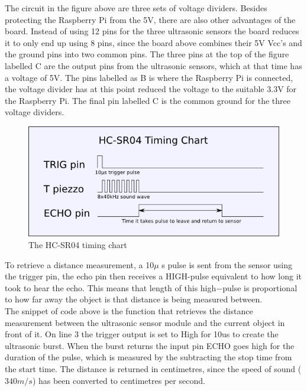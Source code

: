 The circuit in the figure above are three sets of voltage dividers. Besides protecting the Raspberry Pi from the 5V, there are also other advantages of the board. Instead of using 12 pins for the three ultrasonic sensors the board reduces it to only end up using 8 pins, since the board above combines their 5V Vcc's and the ground pins into two common pins.  
The three pins at the top of the figure labelled C are the output pins from the ultrasonic sensors, which at that time has a voltage of 5V. The pins labelled as B is where the Raspberry Pi is connected, the voltage divider has at this point reduced the voltage to the suitable 3.3V for the Raspberry Pi.  
The final pin labelled C is the common ground for the three voltage dividers.

\begin{figure}[H]
	\centering
	\includegraphics[width=.5\linewidth]{images/hcsr04timingchart.png}
	\caption{The HC-SR04 timing chart\cite{hcsr04timingchart}}
\end{figure}

To retrieve a distance measurement, a 10$\mu$ s pulse is sent from the sensor using the trigger pin, the echo pin then receives a HIGH-pulse equivalent to how long it took to hear the echo. This means that length of this high$-$pulse is proportional to how far away the object is that distance is being measured between.\cite{ultrasonichowitworks}\\




The snippet of code above is the function that retrieves the distance measurement between the ultrasonic sensor module and the current object in front of it.
On line 3 the trigger output is set to High for 10us to create the ultrasonic burst. When the burst returns the input pin ECHO goes high for the duration of the pulse, which is measured by the subtracting the stop time from the start time.
The distance is returned in centimetres, since the speed of sound ($340m/s$) has been converted to centimetres per second.
